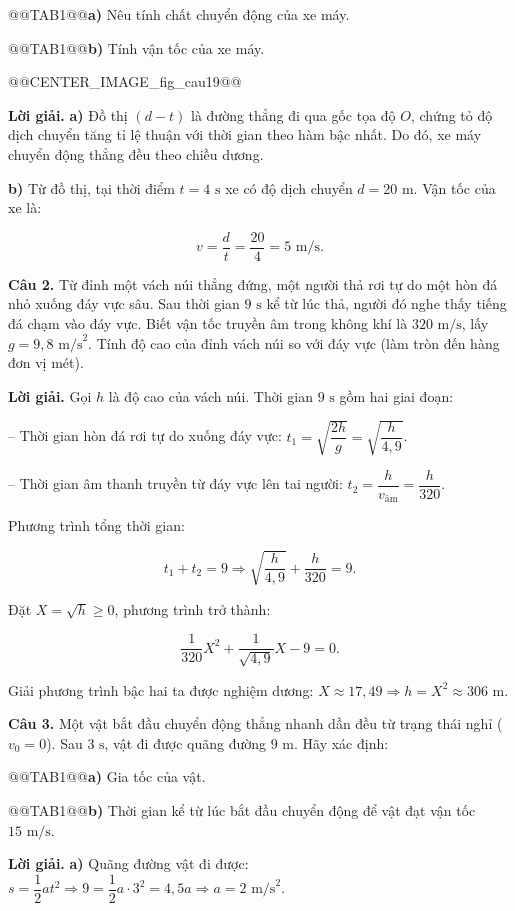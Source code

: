 \documentclass{article}
\begin{document}
@@TAB1@@\textbf{a)} Nêu tính chất chuyển động của xe máy.

@@TAB1@@\textbf{b)} Tính vận tốc của xe máy.

@@CENTER_IMAGE_fig_cau19@@

\textbf{Lời giải.} \textbf{a)} Đồ thị $(d - t)$ là đường thẳng đi qua gốc tọa độ $O$, chứng tỏ độ dịch chuyển tăng tỉ lệ thuận với thời gian theo hàm bậc nhất. Do đó, xe máy chuyển động thẳng đều theo chiều dương.

\textbf{b)} Từ đồ thị, tại thời điểm $t = 4\text{ s}$ xe có độ dịch chuyển $d = 20\text{ m}$. Vận tốc của xe là:

\[v = \frac{d}{t} = \frac{20}{4} = 5\text{ m/s}.\]

\textbf{Câu 2.} Từ đỉnh một vách núi thẳng đứng, một người thả rơi tự do một hòn đá nhỏ xuống đáy vực sâu. Sau thời gian $9\text{ s}$ kể từ lúc thả, người đó nghe thấy tiếng đá chạm vào đáy vực. Biết vận tốc truyền âm trong không khí là $320\text{ m/s}$, lấy $g = 9{,}8\text{ m/s}^2$. Tính độ cao của đỉnh vách núi so với đáy vực (làm tròn đến hàng đơn vị mét).

\textbf{Lời giải.} Gọi $h$ là độ cao của vách núi. Thời gian $9\text{ s}$ gồm hai giai đoạn:

-- Thời gian hòn đá rơi tự do xuống đáy vực: $t_1 = \sqrt{\dfrac{2h}{g}} = \sqrt{\dfrac{h}{4{,}9}}$.

-- Thời gian âm thanh truyền từ đáy vực lên tai người: $t_2 = \dfrac{h}{v_{\text{âm}}} = \dfrac{h}{320}$.

Phương trình tổng thời gian:

\[t_1 + t_2 = 9 \Rightarrow \sqrt{\frac{h}{4{,}9}} + \frac{h}{320} = 9.\]

Đặt $X = \sqrt{h} \ge 0$, phương trình trở thành:

\[\frac{1}{320}X^2 + \frac{1}{\sqrt{4{,}9}}X - 9 = 0.\]

Giải phương trình bậc hai ta được nghiệm dương: $X \approx 17{,}49 \Rightarrow h = X^2 \approx 306\text{ m}$.

\textbf{Câu 3.} Một vật bắt đầu chuyển động thẳng nhanh dần đều từ trạng thái nghỉ ($v_0 = 0$). Sau $3\text{ s}$, vật đi được quãng đường $9\text{ m}$. Hãy xác định:

@@TAB1@@\textbf{a)} Gia tốc của vật.

@@TAB1@@\textbf{b)} Thời gian kể từ lúc bắt đầu chuyển động để vật đạt vận tốc $15\text{ m/s}$.

\textbf{Lời giải.} \textbf{a)} Quãng đường vật đi được: $s = \dfrac{1}{2}at^2 \Rightarrow 9 = \dfrac{1}{2}a \cdot 3^2 = 4{,}5a \Rightarrow a = 2\text{ m/s}^2$.
\end{document}
